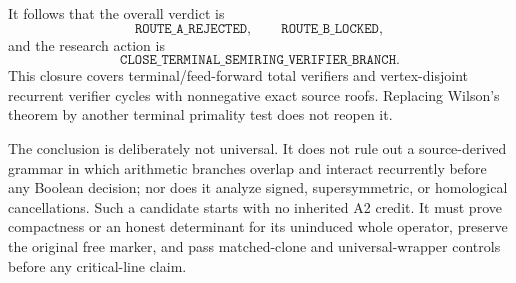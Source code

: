 It follows that the overall verdict is
\[
  \texttt{ROUTE\_A\_REJECTED},\qquad
  \texttt{ROUTE\_B\_LOCKED},
\]
and the research action is
\[
  \texttt{CLOSE\_TERMINAL\_SEMIRING\_VERIFIER\_BRANCH}.
\]
This closure covers terminal/feed-forward total verifiers and
vertex-disjoint recurrent verifier cycles with nonnegative exact source
roofs.  Replacing Wilson's theorem by another terminal primality test does not
reopen it.

The conclusion is deliberately not universal.  It does not rule out a
source-derived grammar in which arithmetic branches overlap and interact
recurrently before any Boolean decision; nor does it analyze signed,
supersymmetric, or homological cancellations.  Such a candidate starts with
no inherited A2 credit.  It must prove compactness or an honest determinant
for its uninduced whole operator, preserve the original free marker, and pass
matched-clone and universal-wrapper controls before any critical-line claim.
